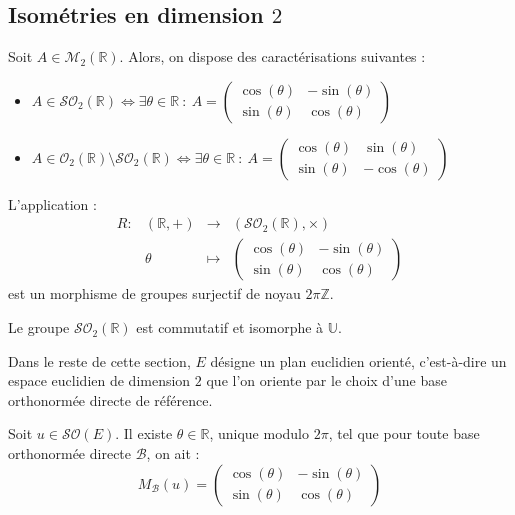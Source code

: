 \documentclass[french]{article}
\newcommand{\Z}{\mathbb{Z}}
\newcommand{\R}{\mathbb{R}}
\newcommand{\U}{\mathbb{U}}
\theoremstyle{plain}
\theoremstyle{definition}
\theoremstyle{remark}
\begin{document}
\subsection{Isométries en dimension $2$}

\begin{thm}{}
	Soit $A\in\mathcal{M}_2(\R)$. Alors, on dispose des caractérisations suivantes :
	\begin{itemize}
		\item $A\in\mathcal{SO}_2(\R)\iff \exists\theta\in\R\ : \ A=\displaystyle\begin{pmatrix}
			\cos(\theta)&-\sin(\theta)\\
			\sin(\theta)&\cos(\theta)
		\end{pmatrix}$
		\item $A\in\mathcal{O}_2(\R)\setminus\mathcal{SO}_2(\R)\iff \exists\theta\in\R\ : \ A=\displaystyle\begin{pmatrix}
			\cos(\theta)&\sin(\theta)\\
			\sin(\theta)&-\cos(\theta)
		\end{pmatrix}$
	\end{itemize}
\end{thm}

\begin{thm}{}
	L'application : $$\begin{array}{lrcl}
		R:&(\R,+)&\longrightarrow&(\mathcal{SO}_2(\R),\times)\\
		&\theta&\longmapsto&\displaystyle\begin{pmatrix}
			\cos(\theta)&-\sin(\theta)\\
			\sin(\theta)&\cos(\theta)
		\end{pmatrix} 
	\end{array}$$ est un morphisme de groupes surjectif de noyau $2\pi\Z$.
\end{thm}

\begin{thm}{}
	Le groupe $\mathcal{SO}_2(\R)$ est commutatif et isomorphe à $\U$.
\end{thm}

Dans le reste de cette section, $E$ désigne un plan euclidien orienté, c'est-à-dire un espace euclidien de dimension $2$ que l'on oriente par le choix d'une base orthonormée directe de référence.

\begin{thm}{}
	Soit $u\in\mathcal{SO}(E)$. Il existe $\theta\in\R$, unique modulo $2\pi$, tel que pour toute base orthonormée directe $\mathcal{B}$, on ait : $$M_\mathcal{B}(u)=\begin{pmatrix}
		\cos(\theta)&-\sin(\theta)\\
		\sin(\theta)&\cos(\theta)
	\end{pmatrix}$$
\end{thm}
\end{document}
